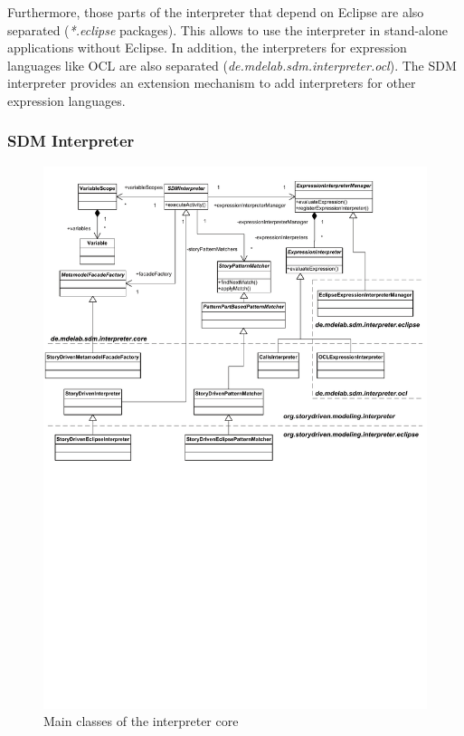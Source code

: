 Furthermore, those parts of the interpreter that depend on Eclipse are also separated (\emph{*.eclipse} packages). 
This allows to use the interpreter in stand-alone applications without Eclipse. 
In addition, the interpreters for expression languages like OCL are also separated (\emph{de.mdelab.sdm.interpreter.ocl}). 
The SDM interpreter provides an extension mechanism to add interpreters for other expression languages.

\subsubsection{SDM Interpreter}
\label{sec:sdm_interpreter}

\begin{figure}[htb]
  \centering
  \includegraphics[width=1.0\columnwidth]{./figures/interpreter_core.pdf}
  \caption{Main classes of the interpreter core}
  \label{fig:sdm_interpreter}
\end{figure}

